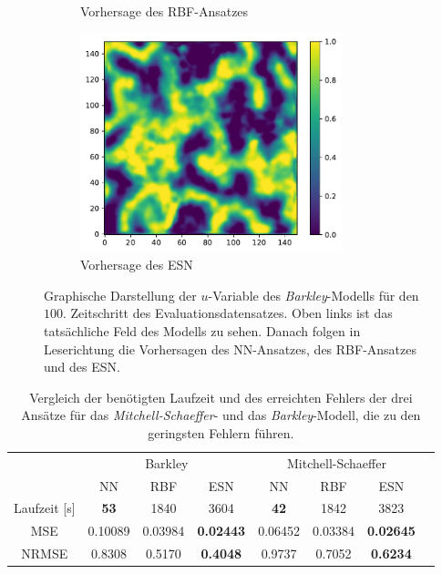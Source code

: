 \begin{figure}[h]
\begin{subfigure}{.5\textwidth}
		\setcapmargin[1cm]{0.5cm}
  		\caption{Vorhersage des \textsc{RBF}-Ansatzes}
  		\label{fig:exp_unblur_barkley_result_rbf_pred}
	\end{subfigure}%
	\begin{subfigure}{.5\textwidth}
		\centering
		\includegraphics[height=2.5in]{figures/results/unblur/esn_barkley_u_blur_pred.pdf}
		\setcapmargin[1cm]{0.5cm}
  		\caption{Vorhersage des \textsc{ESN}}
  		\label{fig:exp_unblur_barkley_result_esn_pred}
	\end{subfigure}
	\caption{Graphische Darstellung der $u$-Variable des \textit{Barkley}-Modells für den $100$. Zeitschritt des Evaluationsdatensatzes. Oben links ist das tatsächliche Feld des Modells zu sehen. Danach folgen in Leserichtung die Vorhersagen des \textsc{NN}-Ansatzes, des \textsc{RBF}-Ansatzes und des \textsc{ESN}.}
	\label{fig:exp_unblur_barkley_result}
\end{figure} 

\begin{table}[h]
	\centering
	\captionsetup{width=0.9\linewidth}
	\begin{tabular}{cccccccc}
		\hline
		\multicolumn{1}{c}{} & \multicolumn{3}{c}{Barkley} & \multicolumn{3}{c}{Mitchell-Schaeffer}		\\
		\multicolumn{1}{c}{} & NN & RBF & ESN & NN & RBF & ESN \\
		
		\hline
		
		Laufzeit [s] 	& \textbf{53} 	& 1840		& 3604				& \textbf{42}	& 1842 		& 3823 \\
		MSE 			& 0.10089		& 0.03984	& \textbf{0.02443} 	& 0.06452		& 0.03384 	& \textbf{0.02645} \\
		NRMSE 			& 0.8308		& 0.5170	& \textbf{0.4048} 	& 0.9737		& 0.7052 	& \textbf{0.6234} \\
		\hline 
	\end{tabular} 
	\caption{Vergleich der benötigten Laufzeit und des erreichten Fehlers der drei Ansätze für das \textit{Mitchell-Schaeffer}- und das \textit{Barkley}-Modell, die zu den geringsten Fehlern führen.}
	\label{tab:exp_unblur_comparison_results}
\end{table}

\FloatBarrier